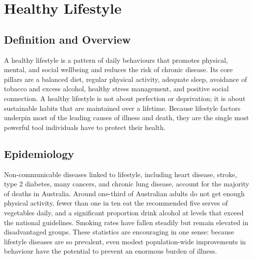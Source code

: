\chapter{Healthy Lifestyle}

\section*{Definition and Overview}
A healthy lifestyle is a pattern of daily behaviours that promotes physical, mental, and social wellbeing and reduces the risk of chronic disease. Its core pillars are a balanced diet, regular physical activity, adequate sleep, avoidance of tobacco and excess alcohol, healthy stress management, and positive social connection. A healthy lifestyle is not about perfection or deprivation; it is about sustainable habits that are maintained over a lifetime. Because lifestyle factors underpin most of the leading causes of illness and death, they are the single most powerful tool individuals have to protect their health.

\section*{Epidemiology}
Non-communicable diseases linked to lifestyle, including heart disease, stroke, type 2 diabetes, many cancers, and chronic lung disease, account for the majority of deaths in Australia. Around one-third of Australian adults do not get enough physical activity, fewer than one in ten eat the recommended five serves of vegetables daily, and a significant proportion drink alcohol at levels that exceed the national guidelines. Smoking rates have fallen steadily but remain elevated in disadvantaged groups. These statistics are encouraging in one sense: because lifestyle diseases are so prevalent, even modest population-wide improvements in behaviour have the potential to prevent an enormous burden of illness.

